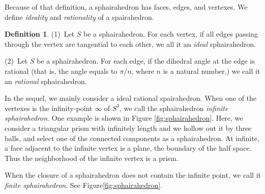 \documentclass[suppldata, dvipdfmx]{interact}
\theoremstyle{plain}%
\theoremstyle{definition}
\newtheorem{definition}[theorem]{Definition}
\theoremstyle{remark}
\theoremstyle{problemstyle}
\begin{document}
Because of that definition, a sphairahedron has faces, edges, and
vertexes. We define \emph{ideality} and \emph{rationality} of a spairahedron.

\begin{definition}
(1)\ Let $S$ be a sphairahedron.  For each vertex, if all edges passing through the vertex are tangential to each other, we all it an \emph{ideal} sphairahedron.\par 
(2)\ Let $S$ be a sphairahedron.  For each edge, if the dihedral angle at the edge is rational (that is, the angle equals to $\pi/n$, where $n$ is a natural number,) we call it an \emph{rational} sphairahedron.
\end{definition}

In the sequel, we mainly consider a ideal rational spairahedron.  
When one of the vertexes is the infinity-point $\infty$ of $S^3$,
we call the sphairahedron \textit{infinite sphairahedron}.
One example is shown in Figure
\ref{fig:sphairahedron}.
Here, we consider a triangular prism with infinitely length and we hollow
out it by three balls, and select one of the connected components as a  sphairahedron.  At infinite, a face adjacent to the infinite vertex is a plane, the boundary of the half space.  Thus the neighborhood of the infinite vertex is a prism.

When the closure of a sphairahedron does not contain the infinite point,
we call it \textit{finite sphairahedron}.
See Figure\ref{fig:sphairahedron}.

\end{document}
